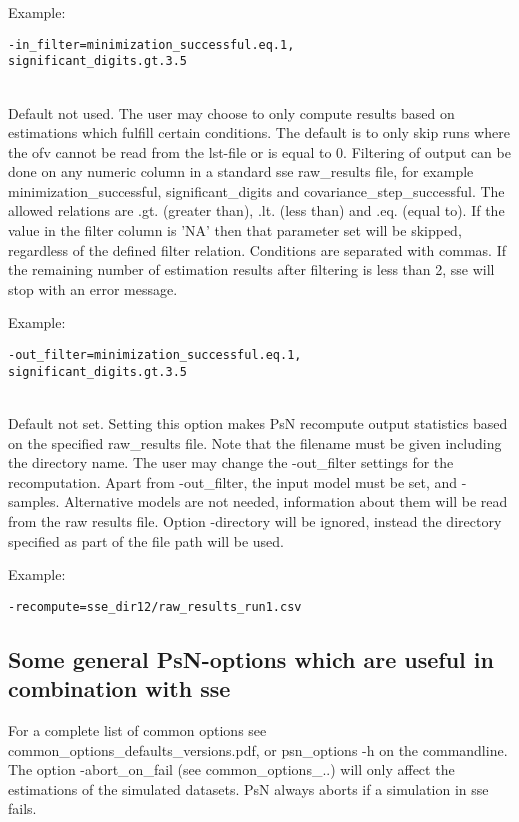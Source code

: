 \begin{optionlist}
Example:
\begin{verbatim}
-in_filter=minimization_successful.eq.1,
significant_digits.gt.3.5
\end{verbatim} \\
\nextopt
{}
Default not used. The user may choose to only compute results based on estimations which fulfill certain conditions. The default is to only skip runs where the ofv cannot be read from the lst-file or is equal to 0. Filtering of output can be done on any numeric column in a standard sse raw\_results file, for example minimization\_successful, significant\_digits and covariance\_step\_successful. The allowed relations are .gt. (greater than), .lt. (less than) and .eq. (equal to). If the value in the filter column is 'NA' then that parameter set will be skipped, regardless of the defined filter relation. Conditions are separated with commas. If the remaining number of estimation results after filtering is less than 2, sse will stop with an error message.


Example:
\begin{verbatim}
-out_filter=minimization_successful.eq.1,
significant_digits.gt.3.5
\end{verbatim} \\
\nextopt
{}
Default not set. Setting this option makes PsN recompute output statistics based on the specified raw\_results file. Note that the filename must be given including the directory name. The user may change the -out\_filter settings for the recomputation. Apart from -out\_filter, the input model must be set, and -samples. Alternative models are not needed, information about them will be read from the raw results file. Option -directory will be ignored, instead the directory specified as part of the file path will be used.


Example:
\begin{verbatim}
-recompute=sse_dir12/raw_results_run1.csv
\end{verbatim}
\nextopt
\end{optionlist}

\subsection{Some general PsN-options which are useful in combination with sse }
For a complete list of common options see common\_options\_defaults\_versions.pdf, or psn\_options -h on the commandline. The option -abort\_on\_fail (see common\_options\_..) will only affect the estimations of the simulated datasets. PsN always aborts if a simulation in sse fails.

